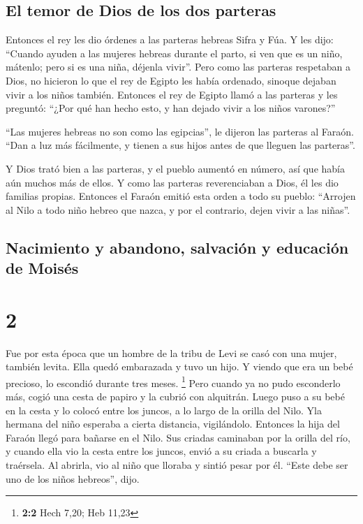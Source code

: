 \hypertarget{el-temor-de-dios-de-los-dos-parteras}{%
\subsection{El temor de Dios de los dos
parteras}\label{el-temor-de-dios-de-los-dos-parteras}}

 Entonces el rey les dio órdenes a las parteras hebreas
Sifra y Fúa.  Y les dijo: ``Cuando ayuden a las mujeres
hebreas durante el parto, si ven que es un niño, mátenlo; pero si es una
niña, déjenla vivir''.  Pero como las parteras respetaban
a Dios, no hicieron lo que el rey de Egipto les había ordenado, sinoque
dejaban vivir a los niños también.  Entonces el rey de
Egipto llamó a las parteras y les preguntó: ``¿Por qué han hecho esto, y
han dejado vivir a los niños varones?''

 ``Las mujeres hebreas no son como las egipcias'', le
dijeron las parteras al Faraón. ``Dan a luz más fácilmente, y tienen a
sus hijos antes de que lleguen las parteras''.

 Y Dios trató bien a las parteras, y el pueblo aumentó en
número, así que había aún muchos más de ellos.  Y como
las parteras reverenciaban a Dios, él les dio familias propias.
 Entonces el Faraón emitió esta orden a todo su pueblo:
``Arrojen al Nilo a todo niño hebreo que nazca, y por el contrario,
dejen vivir a las niñas''.

\hypertarget{nacimiento-y-abandono-salvaciuxf3n-y-educaciuxf3n-de-moisuxe9s}{%
\subsection{Nacimiento y abandono, salvación y educación de
Moisés}\label{nacimiento-y-abandono-salvaciuxf3n-y-educaciuxf3n-de-moisuxe9s}}

\hypertarget{section-1}{%
\section{2}\label{section-1}}

 Fue por esta época que un hombre de la tribu de Levi se
casó con una mujer, también levita.  Ella quedó embarazada
y tuvo un hijo. Y viendo que era un bebé precioso, lo escondió durante
tres meses. \footnote{\textbf{2:2} Hech 7,20; Heb 11,23} 
Pero cuando ya no pudo esconderlo más, cogió una cesta de papiro y la
cubrió con alquitrán. Luego puso a su bebé en la cesta y lo colocó entre
los juncos, a lo largo de la orilla del Nilo.  Yla hermana
del niño esperaba a cierta distancia, vigilándolo. 
Entonces la hija del Faraón llegó para bañarse en el Nilo. Sus criadas
caminaban por la orilla del río, y cuando ella vio la cesta entre los
juncos, envió a su criada a buscarla y traérsela.  Al
abrirla, vio al niño que lloraba y sintió pesar por él. ``Este debe ser
uno de los niños hebreos'', dijo.

